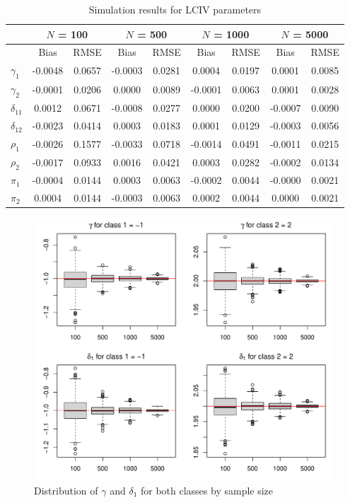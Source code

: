 \documentclass[12pt]{article}\usepackage[]{graphicx}\usepackage[]{xcolor}
\makeatletter
\def\maxwidth{ %
  \ifdim\Gin@nat@width>\linewidth
    \linewidth
  \else
    \Gin@nat@width
  \fi
}
\newenvironment{knitrout}{}{} %
\makeatother
\begin{document}
\begin{longtable}{lcccccccc}
\caption{Simulation results for LCIV parameters} \\ 
  \toprule & \multicolumn{2}{c}{$N$ = 100} & \multicolumn{2}{c}{$N$ = 500} & \multicolumn{2}{c}{$N$ = 1000} &  \multicolumn{2}{c}{$N$ = 5000} \\
 \toprule
 & Bias & RMSE & Bias & RMSE & Bias & RMSE & Bias & RMSE \\ 
  \midrule
$\gamma_{1}$ & -0.0048 & 0.0657 & -0.0003 & 0.0281 & 0.0004 & 0.0197 & 0.0001 & 0.0085 \\ 
  $\gamma_{2}$ & -0.0001 & 0.0206 & 0.0000 & 0.0089 & -0.0001 & 0.0063 & 0.0001 & 0.0028 \\ 
  $\delta_{11}$ & 0.0012 & 0.0671 & -0.0008 & 0.0277 & 0.0000 & 0.0200 & -0.0007 & 0.0090 \\ 
  $\delta_{12}$ & -0.0023 & 0.0414 & 0.0003 & 0.0183 & 0.0001 & 0.0129 & -0.0003 & 0.0056 \\ 
  $\rho_{1}$ & -0.0026 & 0.1577 & -0.0033 & 0.0718 & -0.0014 & 0.0491 & -0.0011 & 0.0215 \\ 
  $\rho_{2}$ & -0.0017 & 0.0933 & 0.0016 & 0.0421 & 0.0003 & 0.0282 & -0.0002 & 0.0134 \\ 
  $\pi_{1}$ & -0.0004 & 0.0144 & 0.0003 & 0.0063 & -0.0002 & 0.0044 & -0.0000 & 0.0021 \\ 
  $\pi_{2}$ & 0.0004 & 0.0144 & -0.0003 & 0.0063 & 0.0002 & 0.0044 & 0.0000 & 0.0021 \\ 
   \bottomrule
\end{longtable}



\begin{figure}[H]
 \caption{Distribution of $\gamma$ and $\delta_1$ for both classes by sample size}
 \centering
\begin{knitrout}
\color{fgcolor}
\includegraphics[width=\maxwidth]{figure/fig1a-1} 
\end{knitrout}
\end{figure}
\end{document}
